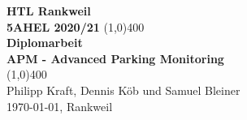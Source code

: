 \begin{titlepage}
  \begin{center}
    \vspace*{1cm}
    \large{\textbf{HTL Rankweil}}\\
    \large{\textbf{5AHEL 2020/21}}
    \vfill
    \line(1,0){400}\\[1mm]
    \huge{\textbf{Diplomarbeit}}\\[3mm]
    \large{\textbf{APM - Advanced Parking Monitoring}}\\[1mm]
    \line(1,0){400}\\
    \vfill
    Philipp Kraft, Dennis Köb und Samuel Bleiner\\[3mm]
    \today, Rankweil
  \end{center}
\end{titlepage}
